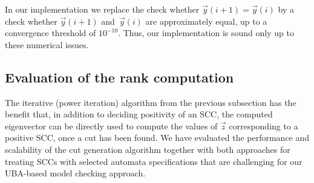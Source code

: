 \documentclass{elsarticle}
\begin{document}
In our implementation we replace the check whether $\vec{y}(i+1) = \vec{y}(i)$ by a check whether $\vec{y}(i+1)$ and~$\vec{y}(i)$ are approximately equal, up to a convergence threshold of $10^{-10}$.
Thus, our implementation is sound only up to these numerical issues.

\subsection{Evaluation of the rank computation}

\label{sec:appendix-experiments}
\label{appendix:experiments}

The iterative (power iteration) algorithm from the previous subsection has the benefit that, in addition to deciding positivity of an SCC,
the computed eigenvector can be directly used to compute
the values of $\vec{z}$ corresponding to a positive SCC, once a cut has been found.
We have evaluated the performance and scalability of
the cut generation algorithm together with both approaches for
treating SCCs with selected automata specifications
that are challenging for our UBA-based model checking approach. 
\end{document}
